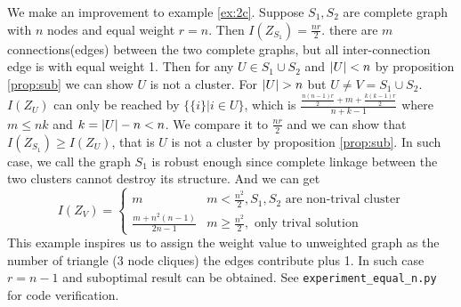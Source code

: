 \documentclass{article}
\begin{document}
\begin{example}\label{ex:2nc}
We make an improvement to example \ref{ex:2c}.
Suppose $S_1, S_2 $ are complete graph with $n$ nodes and equal weight $r=n$. Then $I(Z_{S_1})= \frac{nr}{2}$. there are $m$ connections(edges) between the two complete graphs, but all inter-connection edge is with equal weight 1. Then for any $U \in S_1 \cup S_2 $ and $\lvert U\rvert < n$ by proposition \ref{prop:sub} we can show $U$ is not a cluster.
For $\lvert U\rvert > n$ but $U \neq V = S_1 \cup S_2$. $I(Z_U)$ can only be reached by $\{\{i\}| i\in U\}$, which is $\frac{\frac{n(n-1)r}{2} + m + \frac{k(k-1)r}{2}}{n+k-1}$ where $m \leq nk$ and $k=\lvert U\rvert - n < n$. We compare it to $\frac{nr}{2}$ and we can show that $I(Z_{S_1}) \geq I(Z_U) $, that is $U$ is not a cluster by proposition \ref{prop:sub}. 
In such case, we call the graph $S_1$ is robust enough since complete linkage between the two clusters cannot destroy its structure. And we can get
\begin{equation*}
I(Z_V) = \begin{cases}
m & m <\frac{n^2}{2}, S_1,S_2 \textrm{ are non-trival cluster} \\
\frac{m+n^2(n-1)}{2n-1} & m\geq \frac{n^2}{2}, \textrm{ only trival solution} 
\end{cases}
\end{equation*}
This example inspires us to assign the weight value to unweighted graph as the number of triangle (3 node cliques) the edges contribute plus 1. In such case $ r = n-1$ and suboptimal result can be obtained. See \texttt{experiment\_equal\_n.py} for code verification.
\end{example}


\end{document}
